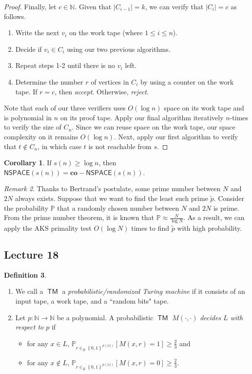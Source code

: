 \documentclass[10pt,letterpaper,cm]{nupset}
\theoremstyle{definition}
\newtheorem{definition}{Definition}[subsection]
\theoremstyle{theorem}
\newtheorem{corollary}[definition]{Corollary}
\theoremstyle{remark}
\newtheorem{remark}[definition]{Remark}
\newcommand{\N}{\mathbb N}
\newcommand{\1}{\mathbf{1}}
\newcommand{\0}{\vec 0}
\DeclareMathOperator{\TM}{\mathsf{TM}}
\begin{document}
\begin{proof}
Finally, let $c\in \N$. Given that $\lvert{C_{i-1}}\rvert=k$, we can verify that $|C_i| = c$ as follows. 
\begin{enumerate} 
\item Write the next $v_i$ on the work tape (where $1\leq i \leq n$). 
\item Decide if $v_i \in C_i$ using our two previous algorithms.
\item Repeat steps 1-2 until there is no $v_i$ left.
\item Determine the number $r$ of vertices in $C_i$ by using a counter on the work tape. If $r = c$, then \textit{accept}. Otherwise, \textit{reject}.
\end{enumerate}

Note that each of our three verifiers uses $O(\log{n})$ space on its work tape and  is polynomial in $n$ on its proof tape. Apply our final algorithm iteratively $n$-times to verify the size of  $C_n$. Since we can reuse space on the work tape, our space complexity on it remains $O(\log{n})$.  Next, apply our first algorithm to verify that $t\notin C_n$, in which case $t$ is not reachable from $s$.
\end{proof}

\begin{corollary}
If $s(n) \geq \log{n}$, then $\mathsf{NSPACE}(s(n)) = \mathbf{co}{-}\mathsf{NSPACE}(s(n))$.
\end{corollary}

\begin{remark}
Thanks to Bertrand's postulate, some prime number between $N$ and $2N$ always exists.  Suppose that we want to find the least such prime $\tilde{p}$. Consider the probability $\mathbb{P}$ that a randomly chosen number between $N$ and $2N$ is prime. From the prime number theorem, it is known that $\mathbb{P} \approx \frac{N}{\log{N}}$. As a result, we can apply the AKS primality test $O(\log{N})$ times to find $\tilde{p}$ with high probability.
\end{remark}

\subsection{Lecture 18}

\begin{definition} $ $
\begin{enumerate}
\item We call a $\TM$ a \textit{probabilistic/randomized Turing machine} if it consists of an input tape, a work tape, and a ``random bits" tape.  
\item Let $p: \N \to \N$ be a polynomial. A probabilistic $\TM$ $M({\cdot}, {\cdot})$ \textit{decides $L$ with respect to $p$} if 
\begin{itemize}
\item for any $x\in L$, $\mathbb{P}_{r\in_R \left\{0,1\right\}^{p(\lvert{x}\rvert)}}[M(x,r)=1] \geq \frac{2}{3}$ and
\item for any $x\notin L$, $\mathbb{P}_{r\in_R \left\{0,1\right\}^{p(\lvert{x}\rvert)}}[M(x,r)=0] \geq \frac{2}{3}$.
\end{itemize}
\end{enumerate}
\end{definition}
\end{document}
